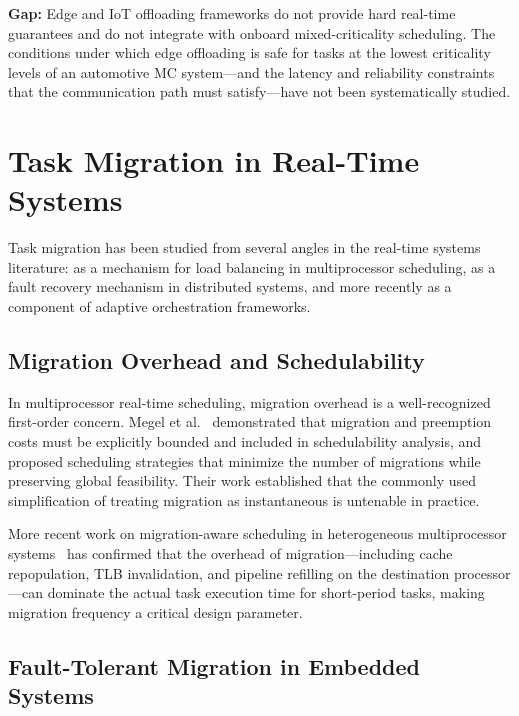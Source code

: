 \textbf{Gap:} Edge and IoT offloading frameworks do not provide hard real-time
guarantees and do not integrate with onboard mixed-criticality scheduling. The
conditions under which edge offloading is safe for tasks at the lowest criticality
levels of an automotive MC system---and the latency and reliability constraints that
the communication path must satisfy---have not been systematically studied.

\section{Task Migration in Real-Time Systems}
\label{sec:rw_migration}

Task migration has been studied from several angles in the real-time systems
literature: as a mechanism for load balancing in multiprocessor scheduling, as a
fault recovery mechanism in distributed systems, and more recently as a component
of adaptive orchestration frameworks.

\subsection{Migration Overhead and Schedulability}
\label{subsec:rw_migration_overhead}

In multiprocessor real-time scheduling, migration overhead is a well-recognized
first-order concern. Megel et al.~\cite{megel2010} demonstrated that migration
and preemption costs must be explicitly bounded and included in schedulability
analysis, and proposed scheduling strategies that minimize the number of migrations
while preserving global feasibility. Their work established that the commonly used
simplification of treating migration as instantaneous is untenable in practice.

More recent work on migration-aware scheduling in heterogeneous multiprocessor
systems~\cite{davis2011} has confirmed that the overhead of migration---including
cache repopulation, TLB invalidation, and pipeline refilling on the destination
processor---can dominate the actual task execution time for short-period tasks,
making migration frequency a critical design parameter.

\subsection{Fault-Tolerant Migration in Embedded Systems}
\label{subsec:rw_migration_fault}

